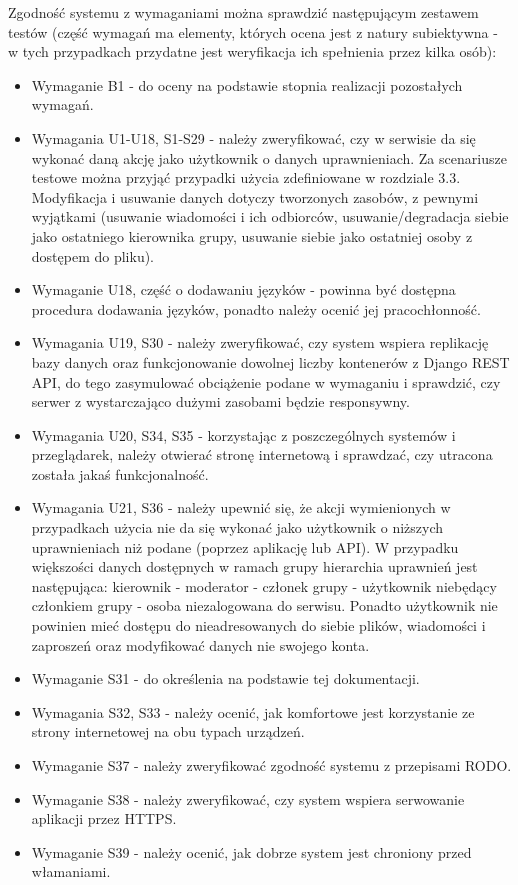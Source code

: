 \documentclass[11pt,a4paper]{article}
\renewcommand{\_}{\char`_}
\begin{document}
Zgodność systemu z wymaganiami można sprawdzić następującym zestawem testów (część wymagań ma elementy, których ocena jest z natury subiektywna - w tych przypadkach przydatne jest weryfikacja ich spełnienia przez kilka osób):
\begin{itemize}
    \item Wymaganie B1 - do oceny na podstawie stopnia realizacji pozostałych wymagań.
    \item Wymagania U1-U18, S1-S29 - należy zweryfikować, czy w serwisie da się wykonać daną akcję jako użytkownik o danych uprawnieniach. Za scenariusze testowe można przyjąć przypadki użycia zdefiniowane w rozdziale 3.3. Modyfikacja i usuwanie danych dotyczy tworzonych zasobów, z pewnymi wyjątkami (usuwanie wiadomości i ich odbiorców, usuwanie/degradacja siebie jako ostatniego kierownika grupy, usuwanie siebie jako ostatniej osoby z dostępem do pliku).
    \item Wymaganie U18, część o dodawaniu języków - powinna być dostępna procedura dodawania języków, ponadto należy ocenić jej pracochłonność.
    \item Wymagania U19, S30 - należy zweryfikować, czy system wspiera replikację bazy danych oraz funkcjonowanie dowolnej liczby kontenerów z Django REST API, do tego zasymulować obciążenie podane w wymaganiu i sprawdzić, czy serwer z wystarczająco dużymi zasobami będzie responsywny.
    \item Wymagania U20, S34, S35 - korzystając z poszczególnych systemów i przeglądarek, należy otwierać stronę internetową i sprawdzać, czy utracona została jakaś funkcjonalność.
    \item Wymagania U21, S36 - należy upewnić się, że akcji wymienionych w przypadkach użycia nie da się wykonać jako użytkownik o niższych uprawnieniach niż podane (poprzez aplikację lub API). W przypadku większości danych dostępnych w ramach grupy hierarchia uprawnień jest następująca: kierownik - moderator - członek grupy - użytkownik niebędący członkiem grupy - osoba niezalogowana do serwisu. Ponadto użytkownik nie powinien mieć dostępu do nieadresowanych do siebie plików, wiadomości i zaproszeń oraz modyfikować danych nie swojego konta.
    \item Wymaganie S31 - do określenia na podstawie tej dokumentacji.
    \item Wymagania S32, S33 - należy ocenić, jak komfortowe jest korzystanie ze strony internetowej na obu typach urządzeń.
    \item Wymaganie S37 - należy zweryfikować zgodność systemu z przepisami RODO.
    \item Wymaganie S38 - należy zweryfikować, czy system wspiera serwowanie aplikacji przez HTTPS.
    \item Wymaganie S39 - należy ocenić, jak dobrze system jest chroniony przed włamaniami.
    
\end{itemize}
\end{document}
